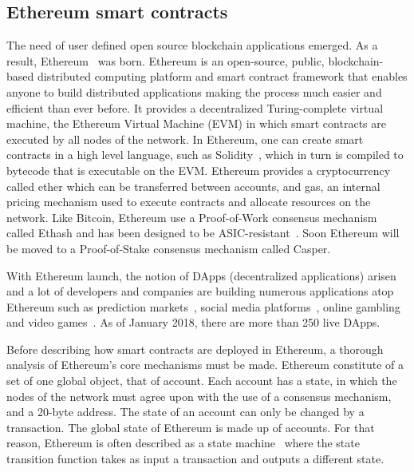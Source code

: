 \subsection{Ethereum smart contracts}
\label{smart_contracts:ethereum}

The need of user defined open source blockchain applications emerged. As a result, Ethereum~\cite{ethereum_yellowpaper, ethereum_whitepaper} was born. Ethereum is an open-source, public, blockchain-based distributed computing platform and smart contract framework that enables anyone to build distributed applications making the process much easier and efficient than ever before. It provides a decentralized Turing-complete virtual machine, the Ethereum Virtual Machine (EVM) in which smart contracts are executed by all nodes of the network. In Ethereum, one can create smart contracts in a high level language, such as Solidity~\cite{solidity}, which in turn is compiled to bytecode that is executable on the EVM. Ethereum provides a cryptocurrency called ether which can be transferred between accounts, and gas, an internal pricing mechanism used to execute contracts and allocate resources on the network. Like Bitcoin, Ethereum use a Proof-of-Work consensus mechanism called Ethash and has been designed to be ASIC-resistant~\cite{ethash}. Soon Ethereum will be moved to a Proof-of-Stake consensus mechanism called Casper.

With Ethereum launch, the notion of DApps (decentralized applications) arisen
and a lot of developers and companies are building numerous applications atop Ethereum such as prediction markets~\cite{augur,gnosis}, social media platforms~\cite{akasha,backfeed},
online gambling~\cite{etheroll,coinpoker} and video games~\cite{cryptokitties}. As of January 2018, there are more than 250 live DApps.

Before describing how smart contracts are deployed in Ethereum, a thorough analysis of Ethereum's core mechanisms must be made. Ethereum constitute of a set of one global object, that of account. Each account has a state, in which the nodes of the network must agree upon with the use of a consensus mechanism, and a 20-byte address. The state of an account can only be changed by a transaction. The global state of Ethereum is made up of accounts. For that reason, Ethereum is often described as a state machine~\cite{ethereum_whitepaper} where the state transition function takes as input a transaction and outputs a different state.

